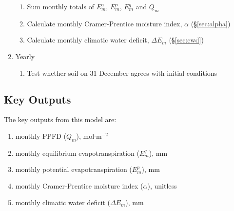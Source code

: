 \begin{enumerate}
\begin{enumerate}
		\item Sum monthly totals of $E_m^a$, $E_m^p$, $E_m^q$ and $Q_m$
		\item Calculate monthly Cramer-Prentice moisture index, $\alpha$ 
		      (\S \ref{sec:alpha})
		\item Calculate monthly climatic water deficit, $\Delta E_m$ 
		      (\S \ref{sec:cwd})
	\end{enumerate}
	\item Yearly
	\begin{enumerate}
		\item Test whether soil on 31 December agrees with initial conditions
	\end{enumerate}
\end{enumerate}

\subsection{Key Outputs}
\label{sec:outputs}
The key outputs from this model are:
\begin{enumerate}
	\item monthly PPFD ($Q_m$), mol$\cdot$m$^{-2}$
	\item monthly equilibrium evapotranspiration ($E_m^q$), mm
	\item monthly potential evapotranspiration ($E_m^p$), mm
	\item monthly Cramer-Prentice moisture index ($\alpha$), unitless
	\item monthly climatic water deficit ($\Delta E_m$), mm
\end{enumerate}

